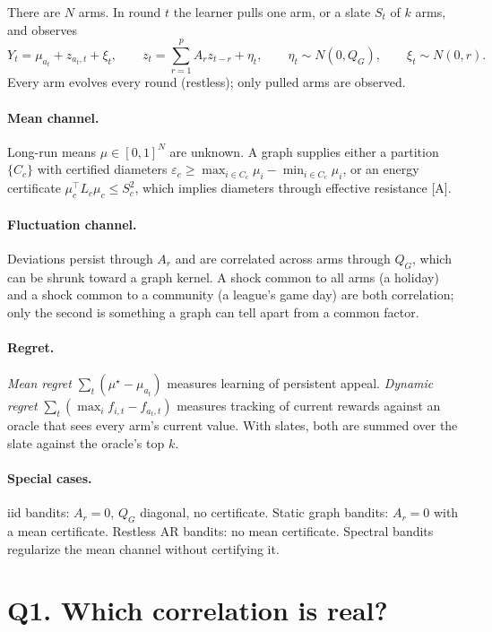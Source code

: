 \documentclass[11pt]{article}
\theoremstyle{definition}
\theoremstyle{remark}
\newcommand{\src}[1]{\textsf{[#1]}}
\begin{document}
There are $N$ arms. In round $t$ the learner pulls one arm, or a slate $S_t$ of $k$ arms, and observes
\begin{equation}\label{eq:model}
Y_t=\mu_{a_t}+z_{a_t,t}+\xi_t,\qquad z_t=\sum_{r=1}^{p}A_r z_{t-r}+\eta_t,\qquad \eta_t\sim N(0,Q_G),\qquad \xi_t\sim N(0,r).
\end{equation}
Every arm evolves every round (restless); only pulled arms are observed.

\paragraph{Mean channel.} Long-run means $\mu\in[0,1]^N$ are unknown. A graph supplies either a partition $\{C_c\}$ with certified diameters $\varepsilon_c\ge\max_{i\in C_c}\mu_i-\min_{i\in C_c}\mu_i$, or an energy certificate $\mu_c^\top L_c\mu_c\le S_c^2$, which implies diameters through effective resistance \src{A}.

\paragraph{Fluctuation channel.} Deviations persist through $A_r$ and are correlated across arms through $Q_G$, which can be shrunk toward a graph kernel. A shock common to all arms (a holiday) and a shock common to a community (a league's game day) are both correlation; only the second is something a graph can tell apart from a common factor.

\paragraph{Regret.} \emph{Mean regret} $\sum_t(\mu^\star-\mu_{a_t})$ measures learning of persistent appeal. \emph{Dynamic regret} $\sum_t(\max_i f_{i,t}-f_{a_t,t})$ measures tracking of current rewards against an oracle that sees every arm's current value. With slates, both are summed over the slate against the oracle's top $k$.

\paragraph{Special cases.} iid bandits: $A_r=0$, $Q_G$ diagonal, no certificate. Static graph bandits: $A_r=0$ with a mean certificate. Restless AR bandits: no mean certificate. Spectral bandits regularize the mean channel without certifying it.

\section{Q1. Which correlation is real?}\label{sec:q1}
\end{document}
